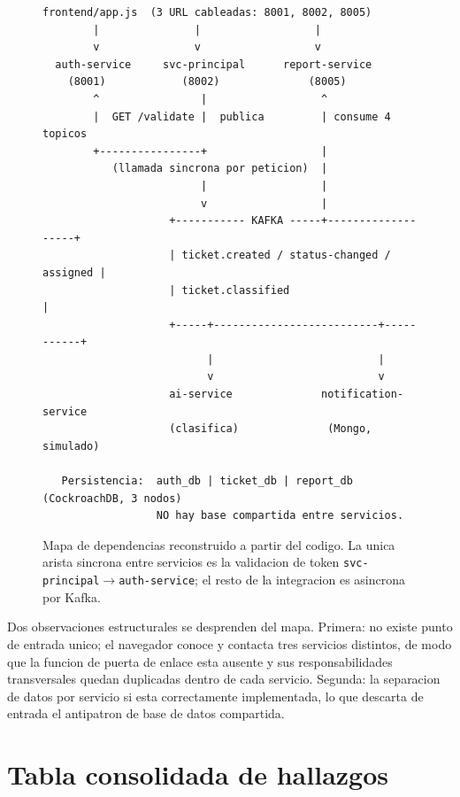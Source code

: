 \documentclass[10pt,a4paper]{article}
\begin{document}
\begin{figure}[h]
\centering
\begin{lstlisting}[numbers=none,basicstyle=\ttfamily\scriptsize]
   frontend/app.js  (3 URL cableadas: 8001, 8002, 8005)
        |               |                  |
        v               v                  v
  auth-service     svc-principal      report-service
    (8001)            (8002)              (8005)
        ^                |                  ^
        |  GET /validate |  publica         | consume 4 topicos
        +----------------+                  |
           (llamada sincrona por peticion)  |
                         |                  |
                         v                  |
                    +----------- KAFKA -----+-------------------+
                    | ticket.created / status-changed / assigned |
                    | ticket.classified                          |
                    +-----+--------------------------+-----------+
                          |                          |
                          v                          v
                    ai-service              notification-service
                    (clasifica)              (Mongo, simulado)

   Persistencia:  auth_db | ticket_db | report_db   (CockroachDB, 3 nodos)
                  NO hay base compartida entre servicios.
\end{lstlisting}
\caption{Mapa de dependencias reconstruido a partir del codigo. La unica arista sincrona
entre servicios es la validacion de token \texttt{svc-principal}$\rightarrow$\texttt{auth-service};
el resto de la integracion es asincrona por Kafka.}
\label{fig:arq}
\end{figure}

Dos observaciones estructurales se desprenden del mapa. Primera: no existe punto de entrada
unico; el navegador conoce y contacta tres servicios distintos, de modo que la funcion de
puerta de enlace esta ausente y sus responsabilidades transversales quedan duplicadas
dentro de cada servicio. Segunda: la separacion de datos por servicio si esta correctamente
implementada, lo que descarta de entrada el antipatron de base de datos compartida.

\section{Tabla consolidada de hallazgos}
\end{document}
